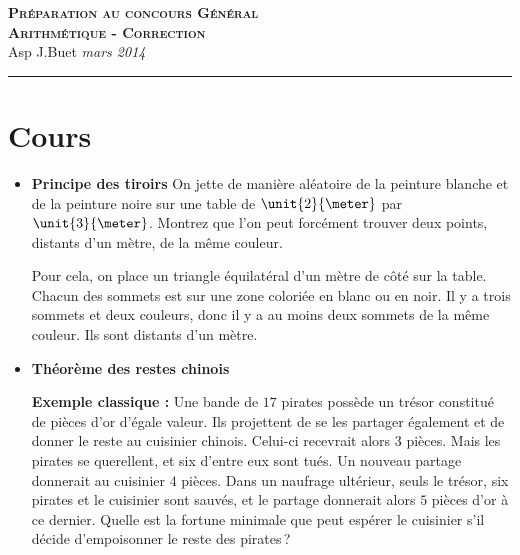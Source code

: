 \documentclass[10pt,a4paper]{article}
\newcommand{\Titre}[3]{\begin{center} {\LARGE\textbf{\textsc{#1}}}\\ #2 \hfill \emph{#3} \\  \hrule\vspace{\baselineskip}\end{center}}
\begin{document}
\Titre{Préparation au concours Général \\  Arithmétique - Correction}{Asp J.Buet}{mars 2014}
\thispagestyle{plain}
\pagestyle{plain}



\section{Cours}

\begin{itemize}

\item \textbf{Principe des tiroirs}
On jette de manière aléatoire de la peinture blanche et de la peinture noire sur une table de $\unit{2}{\meter}$ par $\unit{3}{\meter}$. 
Montrez que l'on peut forcément trouver deux points, distants d'un mètre, de la même couleur.

Pour cela, on place un triangle équilatéral d'un mètre de côté sur la table. Chacun des sommets est sur une zone coloriée en blanc ou en noir. Il y a trois
sommets et deux couleurs, donc il y a au moins deux sommets de la même couleur. Ils sont distants d'un mètre.

\item \textbf{Théorème des restes chinois}

\textbf{Exemple classique : } Une bande de $17$ pirates possède un trésor constitué de pièces d'or d'égale valeur. Ils projettent de se les partager également
et de donner le reste au cuisinier chinois. Celui-ci recevrait alors $3$ pièces. Mais les pirates se querellent, et six d'entre eux sont tués. Un nouveau 
partage donnerait au cuisinier $4$ pièces. Dans un naufrage ultérieur, seuls le trésor, six pirates et le cuisinier sont sauvés, et le partage donnerait alors
$5$ pièces d'or à ce dernier. Quelle est la fortune minimale que peut espérer le cuisinier s'il décide d'empoisonner le reste des pirates\,?


\end{itemize}
\end{document}
